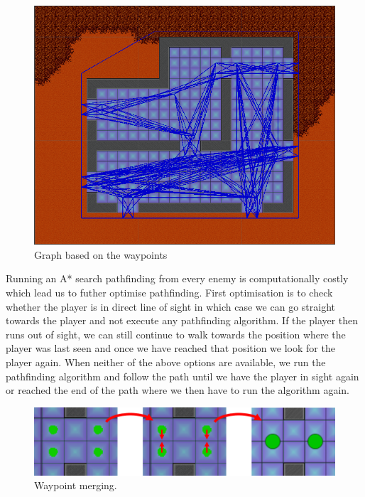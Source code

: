 \begin{figure}[H]
	\includegraphics[width=\textwidth]{figures/astar/waypointsGraph}
	\caption{Graph based on the waypoints}
	\label{waypointgraph}
\end{figure}

Running an A* search pathfinding from every enemy is computationally costly which lead us to futher optimise pathfinding.
First optimisation is to check whether the player is in direct line of sight in which case we can go straight towards the player and not execute any pathfinding algorithm.
If the player then runs out of sight, we can still continue to walk towards the position where the player was last seen and once we have reached that position we look for the player again.
When neither of the above options are available, we run the pathfinding algorithm and follow the path until we have the player in sight again or reached the end of the path where we then have to run the algorithm again.

\begin{figure}[H]
	\includegraphics[width=\textwidth]{figures/astar/waypointMerge}
	\caption{Waypoint merging.}
	\label{waypointMerge}
\end{figure}

